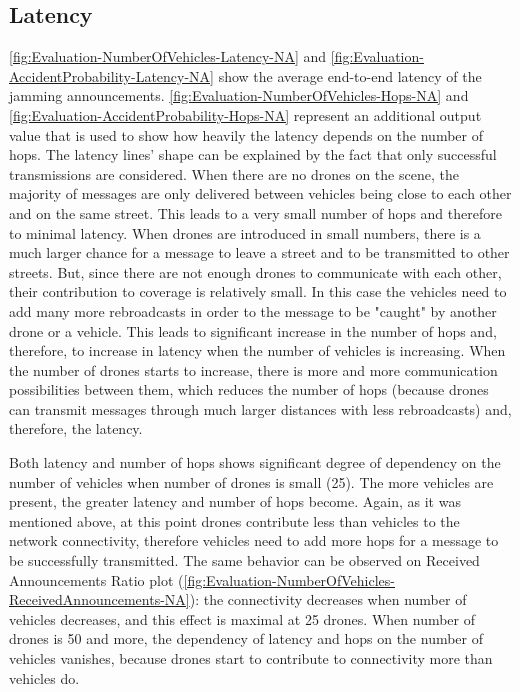 \documentclass[]{nsm-thesis}
\begin{document}
\subsection{Latency}

\cref{fig:Evaluation-NumberOfVehicles-Latency-NA} and \cref{fig:Evaluation-AccidentProbability-Latency-NA} show the average end-to-end latency of the jamming announcements. \cref{fig:Evaluation-NumberOfVehicles-Hops-NA} and \cref{fig:Evaluation-AccidentProbability-Hops-NA} represent an additional output value that is used to show how heavily the latency depends on the number of hops. The latency lines' shape can be explained by the fact that only successful transmissions are considered. When there are no drones on the scene, the majority of messages are only delivered between vehicles being close to each other and on the same street. This leads to a very small number of hops and therefore to minimal latency. When drones are introduced in small numbers, there is a much larger chance for a message to leave a street and to be transmitted to other streets. But, since there are not enough drones to communicate with each other, their contribution to coverage is relatively small. In this case the vehicles need to add many more rebroadcasts in order to the message to be "caught" by another drone or a vehicle. This leads to significant increase in the number of hops and, therefore, to increase in latency when the number of vehicles is increasing. When the number of drones starts to increase, there is more and more communication possibilities between them, which reduces the number of hops (because drones can transmit messages through much larger distances with less rebroadcasts) and, therefore, the latency.

Both latency and number of hops shows significant degree of dependency on the number of vehicles when number of drones is small (25). The more vehicles are present, the greater latency and number of hops become. Again, as it was mentioned above, at this point drones contribute less than vehicles to the network connectivity, therefore vehicles need to add more hops for a message to be successfully transmitted. The same behavior can be observed on Received Announcements Ratio plot (\cref{fig:Evaluation-NumberOfVehicles-ReceivedAnnouncements-NA}): the connectivity decreases when number of vehicles decreases, and this effect is maximal at 25 drones. When number of drones is 50 and more, the dependency of latency and hops on the number of vehicles vanishes, because drones start to contribute to connectivity more than vehicles do. 
\end{document}

